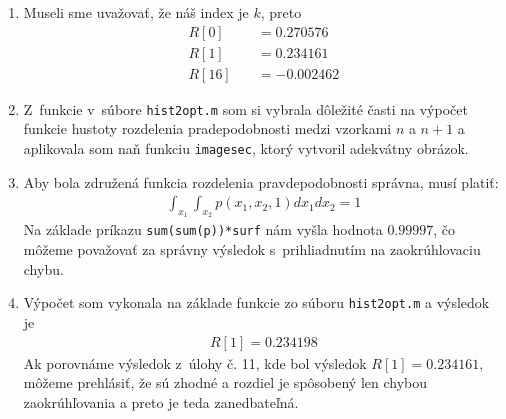\documentclass[10pt, a4paper, twocolumn]{article}
\begin{document}
\begin{enumerate}[leftmargin=*]
\item Museli sme uvažovať, že náš index je $k$, preto
\begin{align}
R[0] \quad&= 0.270576 \nonumber \\
R[1] \quad&= 0.234161 \nonumber \\
R[16] \quad&= -0.002462\nonumber
\end{align}

\item Z~funkcie v~súbore \texttt{hist2opt.m} som si vybrala dôležité časti na výpočet  funkcie hustoty rozdelenia pradepodobnosti medzi vzorkami $n$ a $n+1$ a aplikovala som naň funkciu \texttt{imagesec}, ktorý vytvoril adekvátny obrázok. 
\begin{figure}[H]
\centering
{}
\end{figure}

\item Aby bola združená funkcia rozdelenia pravdepodobnosti správna, musí platiť:
\begin{align}
\int_{x_1} \int_{x_2} p(x_1, x_2, 1) dx_1 dx_2 = 1 \nonumber
\end{align}
Na základe príkazu \texttt{sum(sum(p))*surf} nám vyšla hodnota $0.99997$, čo môžeme považovať za správny výsledok s~prihliadnutím na zaokrúhlovaciu chybu.

\item Výpočet som vykonala na základe funkcie zo súboru \texttt{hist2opt.m} a výsledok je
\begin{align}
R[1] = 0.234198 \nonumber
\end{align}
Ak porovnáme výsledok z~úlohy č. 11, kde bol výsledok $R[1]=0.234161$, môžeme prehlásiť, že sú zhodné a rozdiel je spôsobený len chybou zaokrúhľovania a preto je teda zanedbateľná.

\end{enumerate}
\end{document}

